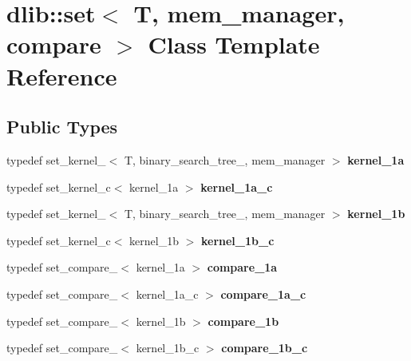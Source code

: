 \hypertarget{classdlib_1_1set}{
\section{dlib::set$<$ T, mem\_\-manager, compare $>$ Class Template Reference}
\label{classdlib_1_1set}
}
\subsection*{Public Types}
\begin{DoxyCompactItemize}
\item 
\hypertarget{classdlib_1_1set_a9b3e9405436a50324f785cca4b3b5bd5}{
typedef set\_\-kernel\_$<$ T, binary\_\-search\_\-tree\_, mem\_\-manager $>$ {\bfseries kernel\_\-1a}}
\label{classdlib_1_1set_a9b3e9405436a50324f785cca4b3b5bd5}

\item 
\hypertarget{classdlib_1_1set_af046069df11ca98af2f96b613c960f75}{
typedef set\_\-kernel\_\-c$<$ kernel\_\-1a $>$ {\bfseries kernel\_\-1a\_\-c}}
\label{classdlib_1_1set_af046069df11ca98af2f96b613c960f75}

\item 
\hypertarget{classdlib_1_1set_a975fcfac04588a270df8ac81a4bc0357}{
typedef set\_\-kernel\_$<$ T, binary\_\-search\_\-tree\_, mem\_\-manager $>$ {\bfseries kernel\_\-1b}}
\label{classdlib_1_1set_a975fcfac04588a270df8ac81a4bc0357}

\item 
\hypertarget{classdlib_1_1set_abd1f170ff843f4f02cb7526285a3c899}{
typedef set\_\-kernel\_\-c$<$ kernel\_\-1b $>$ {\bfseries kernel\_\-1b\_\-c}}
\label{classdlib_1_1set_abd1f170ff843f4f02cb7526285a3c899}

\item 
\hypertarget{classdlib_1_1set_a2955252a8507df6b9a9592807de1fd25}{
typedef set\_\-compare\_$<$ kernel\_\-1a $>$ {\bfseries compare\_\-1a}}
\label{classdlib_1_1set_a2955252a8507df6b9a9592807de1fd25}

\item 
\hypertarget{classdlib_1_1set_aa03ad6bc042968f5b2e9d47f494e72c2}{
typedef set\_\-compare\_$<$ kernel\_\-1a\_\-c $>$ {\bfseries compare\_\-1a\_\-c}}
\label{classdlib_1_1set_aa03ad6bc042968f5b2e9d47f494e72c2}

\item 
\hypertarget{classdlib_1_1set_ae3b3b08294020e4990c0ec5f78273f34}{
typedef set\_\-compare\_$<$ kernel\_\-1b $>$ {\bfseries compare\_\-1b}}
\label{classdlib_1_1set_ae3b3b08294020e4990c0ec5f78273f34}

\item 
\hypertarget{classdlib_1_1set_ab4a7897c9c2ff109415c5131beee472e}{
typedef set\_\-compare\_$<$ kernel\_\-1b\_\-c $>$ {\bfseries compare\_\-1b\_\-c}}
\label{classdlib_1_1set_ab4a7897c9c2ff109415c5131beee472e}

\end{DoxyCompactItemize}
